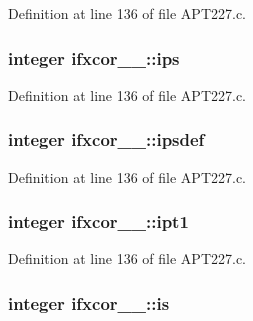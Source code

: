 Definition at line 136 of file A\+P\+T227.\+c.

\subsubsection[{\texorpdfstring{ips}{ips}}]{\setlength{\rightskip}{0pt plus 5cm}integer ifxcor\+\_\+\_\+\+::ips}\hypertarget{structifxcor__1___a8f900763eff2984f372676f359f486a7}{}\label{structifxcor__1___a8f900763eff2984f372676f359f486a7}


Definition at line 136 of file A\+P\+T227.\+c.

\subsubsection[{\texorpdfstring{ipsdef}{ipsdef}}]{\setlength{\rightskip}{0pt plus 5cm}integer ifxcor\+\_\+\_\+\+::ipsdef}\hypertarget{structifxcor__1___a93bfc5f7209915686945974750be2e9a}{}\label{structifxcor__1___a93bfc5f7209915686945974750be2e9a}


Definition at line 136 of file A\+P\+T227.\+c.

\subsubsection[{\texorpdfstring{ipt1}{ipt1}}]{\setlength{\rightskip}{0pt plus 5cm}integer ifxcor\+\_\+\_\+\+::ipt1}\hypertarget{structifxcor__1___a9439f6c1583b95844b57a5bde9c3beaa}{}\label{structifxcor__1___a9439f6c1583b95844b57a5bde9c3beaa}


Definition at line 136 of file A\+P\+T227.\+c.

\subsubsection[{\texorpdfstring{is}{is}}]{\setlength{\rightskip}{0pt plus 5cm}integer ifxcor\+\_\+\_\+\+::is}\hypertarget{structifxcor__1___a6d491e9cd04056431ee79fb893adc4a2}{}\label{structifxcor__1___a6d491e9cd04056431ee79fb893adc4a2}


